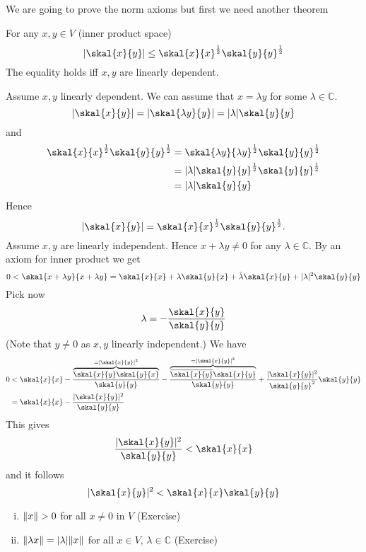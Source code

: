 \begin{beweis}
	We are going to prove the norm axioms but first we need another theorem
	\begin{theorem}
		For any $x,y \in V$ (inner product space) 
		\[
			\abs{\skal{x}{y}} \leq \skal{x}{x}^{\frac{1}{2}} \skal{y}{y}^{\frac{1}{2}}
		\]
		The equality holds iff $x,y$ are linearly dependent.
	\end{theorem}
	\begin{beweis}
		Assume $x,y$ linearly dependent. We can assume that $x= \lambda y$ for some $\lambda \in \mathbb{C} $.
		\[
			\abs{\skal{x}{y}} = \abs{ \skal{\lambda y}{y}} = \abs{\lambda} \skal{y}{y}
		\]
		and
		\begin{align*}
					\skal{x}{x}^{\frac{1}{2}} \skal{y}{y}^{\frac{1}{2}} &= \skal{\lambda y}{\lambda y}^{\frac{1}{2}} \skal{y}{y}^{\frac{1}{2}} \\
					&= \abs{\lambda} \skal{y}{y}^{\frac{1}{2}} \skal{y}{y}^{\frac{1}{2}} \\
					&= \abs{\lambda} \skal{y}{y}
		\end{align*}
		Hence \[
			\abs{\skal{x}{y}} = \skal{x}{x}^{\frac{1}{2}} \skal{y}{y}^{\frac{1}{2}}.
		\]
		Assume $x,y$ are linearly independent. Hence $x + \lambda y \neq 0$ for any $\lambda \in \mathbb{C}$. By an axiom for inner product we get
		\[
			0< \skal{x+ \lambda y}{x + \lambda y} = \skal{x}{x} + \lambda \skal{y}{x} + \bar{\lambda} \skal{x}{y} + \abs{\lambda}^2 \skal{y}{y}
		\]
		Pick now
		\[
			\lambda = - \frac{\skal{x}{y}}{\skal{y}{y}}
		\]
		(Note that $y \neq 0$ as $x,y$ linearly independent.)
		We have \begin{align*}
						0 &< \skal{x}{x} - \frac{\overset{= \abs{\skal{x}{y}}^2}{\overbrace{\skal{x}{y}\skal{y}{x}}}}{\skal{y}{y}} - \frac{\overset{= \abs{\skal{x}{y}}^2}{\overbrace{\overline{\skal{x}{y}}\skal{x}{y}}}}{\skal{y}{y}}+ \frac{\abs{\skal{x}{y}}^2}{\skal{y}{y}^2} \skal{y}{y} \\
						&= \skal{x}{x} - \frac{\abs{\skal{x}{y}}^2}{\skal{y}{y}}
		\end{align*}
		This gives
		\[
			\frac{\abs{\skal{x}{y}}^2}{\skal{y}{y}} < \skal{x}{x}
		\]
		and it follows
		\[
			\abs{\skal{x}{y}}^2 < \skal{x}{x} \skal{y}{y}
		\]
	\end{beweis}
	\begin{enumerate}[(i)]
		\item $\norm{x} >0$ for all $x \neq 0$ in $V$ (Exercise)
		\item $\norm{\lambda x} = \abs{\lambda} \norm{x}$ for all $x \in V$, $\lambda \in \mathbb{C}$ (Exercise)

\end{enumerate}
\end{beweis}
